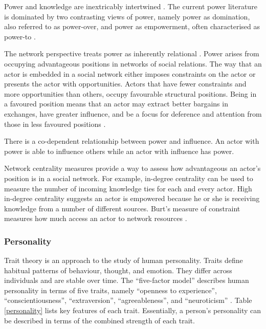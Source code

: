 Power and knowledge are inextricably intertwined \citep{gaventa2007power}. The current power literature is dominated by two contrasting views of power, namely power as domination, also referred to as power-over, and power as empowerment, often characterised as power-to \citep{haugaard2012rethinking}. 




The network perspective treats power as inherently relational \citep{ibarra1993network}. Power arises from occupying advantageous positions in networks of social relations. The way that an actor is embedded in a social network either imposes constraints on the actor or presents the actor with opportunities. Actors that have fewer constraints and more opportunities than others, occupy favourable structural positions. Being in a favoured position means that an actor may extract better bargains in exchanges, have greater influence, and be a focus for deference and attention from those in less favoured positions \citep{burt1992structural,hanneman2005introduction}. 

There is a co-dependent relationship between power and influence. An actor with power is able to influence others while an actor with influence has power. 

Network centrality measures provide a way to assess how advantageous an actor's position is in a social network. For example, in-degree centrality can be used to measure the number of incoming knowledge ties for each and every actor. High in-degree centrality suggests an actor is empowered because he or she is receiving knowledge from a number of different sources. Burt's measure of constraint measures how much access an actor to network resources \citep{burt1987social}. 




\subsubsection{Personality}

Trait theory is an approach to the study of human personality. Traits define habitual patterns of behaviour, thought, and emotion. They differ across individuals and are stable over time. The \enquote{five-factor model} describes human personality in terms of five traits, namely \enquote{openness to experience}, \enquote{conscientiousness}, \enquote{extraversion}, \enquote{agreeableness}, and \enquote{neuroticism} \citep{mccrae1992introduction}. Table \ref{personality} lists key features of each trait. Essentially, a person's personality can be described in terms of the combined strength of each trait. \medskip 

